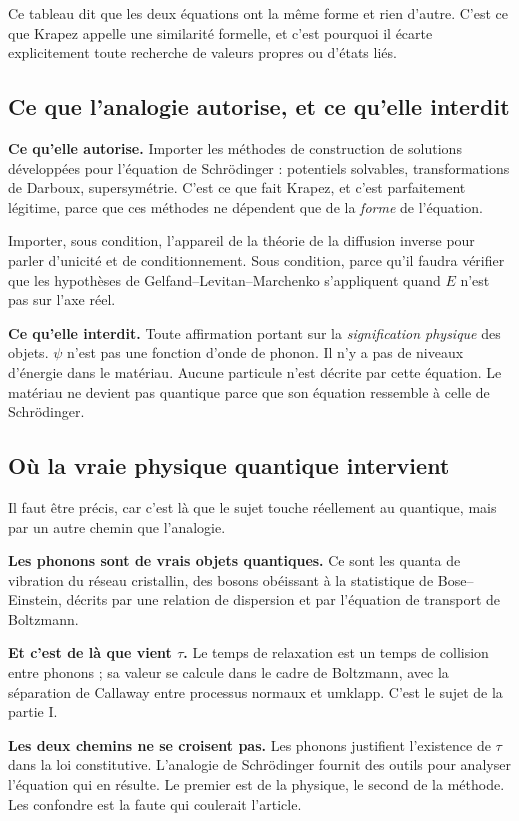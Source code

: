 \documentclass[11pt,a4paper]{article}
\begin{document}
\medskip
Ce tableau dit que les deux équations ont la même forme et rien d'autre. C'est ce que Krapez appelle
une similarité formelle, et c'est pourquoi il écarte explicitement toute recherche de valeurs propres
ou d'états liés.

\subsection{Ce que l'analogie autorise, et ce qu'elle interdit}

\textbf{Ce qu'elle autorise.} Importer les méthodes de construction de solutions développées pour
l'équation de Schrödinger : potentiels solvables, transformations de Darboux, supersymétrie. C'est ce
que fait Krapez, et c'est parfaitement légitime, parce que ces méthodes ne dépendent que de la
\emph{forme} de l'équation.

Importer, sous condition, l'appareil de la théorie de la diffusion inverse pour parler d'unicité et de
conditionnement. Sous condition, parce qu'il faudra vérifier que les hypothèses de
Gelfand--Levitan--Marchenko s'appliquent quand $E$ n'est pas sur l'axe réel.

\textbf{Ce qu'elle interdit.} Toute affirmation portant sur la \emph{signification physique} des
objets. $\psi$ n'est pas une fonction d'onde de phonon. Il n'y a pas de niveaux d'énergie dans le
matériau. Aucune particule n'est décrite par cette équation. Le matériau ne devient pas quantique parce
que son équation ressemble à celle de Schrödinger.

\subsection{Où la vraie physique quantique intervient}

Il faut être précis, car c'est là que le sujet touche réellement au quantique, mais par un autre chemin
que l'analogie.

\textbf{Les phonons sont de vrais objets quantiques.} Ce sont les quanta de vibration du réseau
cristallin, des bosons obéissant à la statistique de Bose--Einstein, décrits par une relation de
dispersion et par l'équation de transport de Boltzmann.

\textbf{Et c'est de là que vient $\tau$.} Le temps de relaxation est un temps de collision entre
phonons ; sa valeur se calcule dans le cadre de Boltzmann, avec la séparation de Callaway entre
processus normaux et umklapp. C'est le sujet de la partie I.

\textbf{Les deux chemins ne se croisent pas.} Les phonons justifient l'existence de $\tau$ dans la loi
constitutive. L'analogie de Schrödinger fournit des outils pour analyser l'équation qui en résulte. Le
premier est de la physique, le second de la méthode. Les confondre est la faute qui coulerait
l'article.
\end{document}
